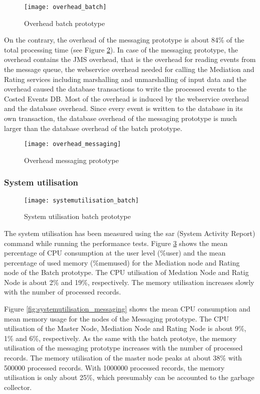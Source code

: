 \begin{figure}[htbp]
	\centering
	\texttt{[image: overhead\_batch]}
	\caption{Overhead batch prototype}
	\label{fig:overhead_batch}
\end{figure}

On the contrary, the overhead of the messaging prototype is about 84\% of the total processing time (see Figure \ref{fig:overhead_messaging}). In case of the messaging prototype, the overhead contains the JMS overhead, that is the overhead for reading events from the message queue, the webservice overhead needed for calling the Mediation and Rating services including marshalling and unmarshalling of input data and the overhead caused the database transactions to write the processed events to the Costed Events DB. Most of the overhead is induced by the webservice overhead and the database overhead. Since every event is written to the database in its own transaction, the database overhead of the messaging prototype is much larger than the database overhead of the batch prototype.

\begin{figure}[htbp]
	\centering
	\texttt{[image: overhead\_messaging]}
	\caption{Overhead messaging prototype}
	\label{fig:overhead_messaging}
\end{figure}

\subsubsection{System utilisation}

\begin{figure}[htbp]
	\centering
	\texttt{[image: systemutilisation\_batch]}
	\caption{System utilisation batch prototype}
	\label{fig:systemutilisation_batch}
\end{figure}

The system utilisation has been measured using the sar (System Activity Report) command while running the performance tests. Figure \ref{fig:systemutilisation_batch} shows the mean percentage of CPU consumption at the user level (\%user) and the mean percentage of used memory (\%memused) for the Mediation node and Rating node of the Batch prototype.
The CPU utilisation of Medation Node and Ratig Node is about 2\% and 19\%, respectively. The memory utilisation increases slowly with the number of processed records.

Figure \ref{fig:systemutilisation_messaging} shows the mean CPU consumption and mean memory usage for the nodes of the Messaging prototype. The CPU utilisation of the Master Node, Mediation Node and Rating Node is about 9\%, 1\% and 6\%, respectively.
As the same with the batch prototye, the memory utilisation of the messaging prototype increases with the number of processed records. The memory utilisation of the master node peaks at about 38\% with 500000 processed records.
With 1000000 processed records, the memory utilisation is only about 25\%, which presumably can be accounted to the garbage collector.


